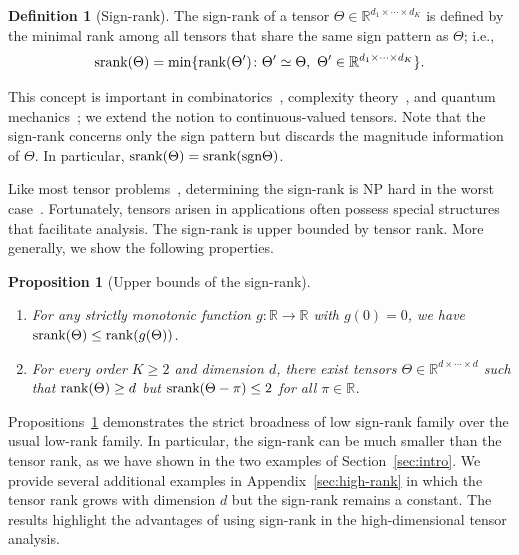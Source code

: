 \documentclass{article}
\theoremstyle{plain}
\newtheorem{prop}{Proposition}
\theoremstyle{definition}
\newtheorem{defn}{Definition}
\def\sign{\textup{sgn}}
\def\srank{\textup{srank}}
\def\rank{\textup{rank}}
\begin{document}
\vspace{.1cm}
\begin{defn}[Sign-rank]
The sign-rank of a tensor $\Theta\in\mathbb{R}^{d_1\times \cdots \times d_K}$ is defined by the minimal rank among all tensors that share the same sign pattern as $\Theta$; i.e.,
\[
\srank(\Theta) = \min \{\rank(\Theta')\colon  \Theta'\simeq \Theta,\ \Theta'\in\mathbb{R}^{d_1\times \cdots \times d_K}\}.
\]
\end{defn}
This concept is important in combinatorics~\citep{cohn2013fast}, complexity theory~\citep{alon2016sign}, and quantum mechanics~\citep{de2003nondeterministic}; we extend the notion to continuous-valued tensors. Note that the sign-rank concerns only the sign pattern but discards the magnitude information of $\Theta$. In particular, $\srank(\Theta)=\srank(\sign \Theta)$. 

Like most tensor problems~\citep{hillar2013most}, determining the sign-rank is NP hard in the worst case~\citep{alon2016sign}. Fortunately, tensors arisen in applications often possess special structures that facilitate analysis. The sign-rank is upper bounded by tensor rank. More generally, we show the following properties.
\vspace{.1cm}
\begin{prop}[Upper bounds of the sign-rank]~\label{cor:monotonic} \hfill
\begin{enumerate}[label={2.\arabic*},wide, labelwidth=!, labelindent=0pt,itemsep=0ex,parsep=0ex,topsep=-7pt]
\item[(a)] [Upper bounds] For any strictly monotonic function $g\colon \mathbb{R}\to \mathbb{R}$ with $g(0)=0$,  we have $\textup{srank}(\Theta)\leq\rank(g(\Theta))$.
\item[(b)] [Broadness] For every order $K\geq 2$ and dimension $d$, there exist tensors $\Theta\in\mathbb{R}^{d\times \cdots \times d}$ such that $\rank(\Theta)\geq d$ but $\srank(\Theta-\pi)\leq 2$ for all $\pi\in\mathbb{R}$.  
\end{enumerate}
\end{prop}
Propositions~\ref{cor:monotonic} demonstrates the strict broadness of low sign-rank family over the usual low-rank family. 
In particular, the sign-rank can be much smaller than the tensor rank, as we have shown in the two examples of Section~\ref{sec:intro}. We provide several additional examples in Appendix~\ref{sec:high-rank} in which the tensor rank grows with dimension $d$ but the sign-rank remains a constant. The results highlight the advantages of using sign-rank in the high-dimensional tensor analysis. 
\end{document}
